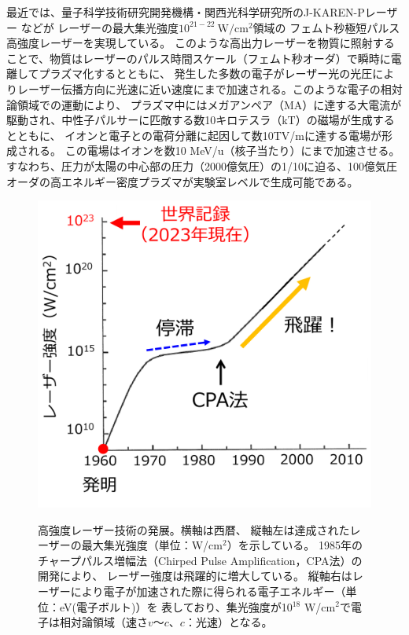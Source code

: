 \documentclass[a4paper,11pt,titlepage]{jsarticle}
\begin{document}
  最近では、量子科学技術研究開発機構・関西光科学研究所のJ-KAREN-Pレーザー
  \cite{Kiriyama2015, AlexOE2017,  Kiriyama2018,Kiriyama2020}などが
  レーザーの最大集光強度$10^{21-22}\ \mathrm{W/cm^{2}}$領域の
  フェムト秒極短パルス高強度レーザーを実現している。
  このような高出力レーザーを物質に照射することで、物質はレーザーのパルス時間スケール（フェムト秒オーダ）で瞬時に電離してプラズマ化するとともに、
  発生した多数の電子がレーザー光の光圧によりレーザー伝播方向に光速に近い速度にまで加速される。このような電子の相対論領域での運動により、
  プラズマ中にはメガアンペア（MA）に達する大電流が駆動され、中性子パルサーに匹敵する数10キロテスラ（kT）の磁場が生成するとともに、
  イオンと電子との電荷分離に起因して数10TV/mに達する電場が形成される。
  この電場はイオンを数10 MeV/u（核子当たり）にまで加速させる。
  すなわち、圧力が太陽の中心部の圧力（2000億気圧）の1/10に迫る、100億気圧オーダの高エネルギー密度プラズマが実験室レベルで生成可能である。

  \begin{figure}[H]
    \begin{center}
      \includegraphics[scale=0.4]{./image/1-laser.png}
      \label{fig:1}
      \caption{高強度レーザー技術の発展。横軸は西暦、
      縦軸左は達成されたレーザーの最大集光強度（単位：W/cm$^2$）を示している。
      1985年のチャープパルス増幅法（Chirped Pulse Amplification，CPA法）の開発により、
      レーザー強度は飛躍的に増大している。
      縦軸右はレーザーにより電子が加速された際に得られる電子エネルギー（単位：eV(電子ボルト)）を
      表しており、集光強度が10$^{18}$ W/cm$^{2}$で電子は相対論領域（速さ$v$～$c$、$c$：光速）となる。}
    \end{center}
  \end{figure}
\end{document}
